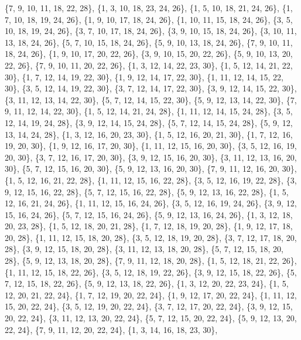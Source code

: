 \documentclass[11pt,a4paper]{article}
\begin{document}
{\{7, 9, 10, 11, 18, 22, 28\}, \{1, 3, 10, 18, 23, 24, 26\}, \{1, 5, 10, 18, 21, 24, 26\}, \{1, 7, 10, 18, 19, 24, 26\}, \{1, 9, 10, 17, 18, 24, 26\},
\{1, 10, 11, 15, 18, 24, 26\}, \{3, 5, 10, 18, 19, 24, 26\}, \{3, 7, 10, 17, 18, 24, 26\}, \{3, 9, 10, 15, 18, 24, 26\}, \{3, 10, 11, 13, 18, 24, 26\},
\{5, 7, 10, 15, 18, 24, 26\}, \{5, 9, 10, 13, 18, 24, 26\}, \{7, 9, 10, 11, 18, 24, 26\}, \{1, 9, 10, 17, 20, 22, 26\}, \{3, 9, 10, 15, 20, 22, 26\},
\{5, 9, 10, 13, 20, 22, 26\}, \{7, 9, 10, 11, 20, 22, 26\}, \{1, 3, 12, 14, 22, 23, 30\}, \{1, 5, 12, 14, 21, 22, 30\}, \{1, 7, 12, 14, 19, 22, 30\},
\{1, 9, 12, 14, 17, 22, 30\}, \{1, 11, 12, 14, 15, 22, 30\}, \{3, 5, 12, 14, 19, 22, 30\}, \{3, 7, 12, 14, 17, 22, 30\}, \{3, 9, 12, 14, 15, 22, 30\},
\{3, 11, 12, 13, 14, 22, 30\}, \{5, 7, 12, 14, 15, 22, 30\}, \{5, 9, 12, 13, 14, 22, 30\}, \{7, 9, 11, 12, 14, 22, 30\}, \{1, 5, 12, 14, 21, 24, 28\},
\{1, 11, 12, 14, 15, 24, 28\}, \{3, 5, 12, 14, 19, 24, 28\}, \{3, 9, 12, 14, 15, 24, 28\}, \{5, 7, 12, 14, 15, 24, 28\}, \{5, 9, 12, 13, 14, 24, 28\},
\{1, 3, 12, 16, 20, 23, 30\}, \{1, 5, 12, 16, 20, 21, 30\}, \{1, 7, 12, 16, 19, 20, 30\}, \{1, 9, 12, 16, 17, 20, 30\}, \{1, 11, 12, 15, 16, 20, 30\},
\{3, 5, 12, 16, 19, 20, 30\}, \{3, 7, 12, 16, 17, 20, 30\}, \{3, 9, 12, 15, 16, 20, 30\}, \{3, 11, 12, 13, 16, 20, 30\}, \{5, 7, 12, 15, 16, 20, 30\},
\{5, 9, 12, 13, 16, 20, 30\}, \{7, 9, 11, 12, 16, 20, 30\}, \{1, 5, 12, 16, 21, 22, 28\}, \{1, 11, 12, 15, 16, 22, 28\}, \{3, 5, 12, 16, 19, 22, 28\},
\{3, 9, 12, 15, 16, 22, 28\}, \{5, 7, 12, 15, 16, 22, 28\}, \{5, 9, 12, 13, 16, 22, 28\}, \{1, 5, 12, 16, 21, 24, 26\}, \{1, 11, 12, 15, 16, 24, 26\},
\{3, 5, 12, 16, 19, 24, 26\}, \{3, 9, 12, 15, 16, 24, 26\}, \{5, 7, 12, 15, 16, 24, 26\}, \{5, 9, 12, 13, 16, 24, 26\}, \{1, 3, 12, 18, 20, 23, 28\},
\{1, 5, 12, 18, 20, 21, 28\}, \{1, 7, 12, 18, 19, 20, 28\}, \{1, 9, 12, 17, 18, 20, 28\}, \{1, 11, 12, 15, 18, 20, 28\}, \{3, 5, 12, 18, 19, 20, 28\},
\{3, 7, 12, 17, 18, 20, 28\}, \{3, 9, 12, 15, 18, 20, 28\}, \{3, 11, 12, 13, 18, 20, 28\}, \{5, 7, 12, 15, 18, 20, 28\}, \{5, 9, 12, 13, 18, 20, 28\},
\{7, 9, 11, 12, 18, 20, 28\}, \{1, 5, 12, 18, 21, 22, 26\}, \{1, 11, 12, 15, 18, 22, 26\}, \{3, 5, 12, 18, 19, 22, 26\}, \{3, 9, 12, 15, 18, 22, 26\},
\{5, 7, 12, 15, 18, 22, 26\}, \{5, 9, 12, 13, 18, 22, 26\}, \{1, 3, 12, 20, 22, 23, 24\}, \{1, 5, 12, 20, 21, 22, 24\}, \{1, 7, 12, 19, 20, 22, 24\},
\{1, 9, 12, 17, 20, 22, 24\}, \{1, 11, 12, 15, 20, 22, 24\}, \{3, 5, 12, 19, 20, 22, 24\}, \{3, 7, 12, 17, 20, 22, 24\}, \{3, 9, 12, 15, 20, 22, 24\},
\{3, 11, 12, 13, 20, 22, 24\}, \{5, 7, 12, 15, 20, 22, 24\}, \{5, 9, 12, 13, 20, 22, 24\}, \{7, 9, 11, 12, 20, 22, 24\}, \{1, 3, 14, 16, 18, 23, 30\},
}
\end{document}
